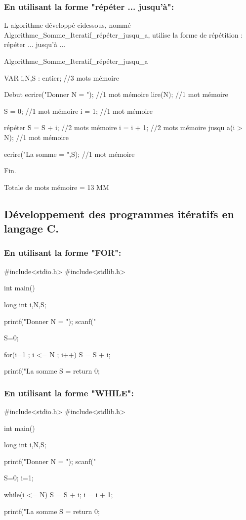 \documentclass[•]{article}
\begin{document}
\subsubsection{En utilisant la forme "répéter ... jusqu'à":}
\textrm{L algorithme développé ci\-dessous, nommé Algorithme\_Somme\_Iteratif\_répéter\_jusqu\_a, utilise la forme de répétition : répéter ... jusqu'à ...}
\begin{sql}

 Algorithme_Somme_Iteratif_répéter_jusqu_a
 
 VAR
 i,N,S : entier;				//3 mots mémoire
 
 Debut
	ecrire("Donner N = ");		//1 mot mémoire
	lire(N);					//1 mot mémoire
	
	S = 0;						//1 mot mémoire
	i = 1;						//1 mot mémoire
	
	répéter
		S = S + i;				//2 mots mémoire
		i = i + 1;				//2 mots mémoire
	  jusqu a(i > N);			//1 mot mémoire
	  
	ecrire("La somme = ",S);	//1 mot mémoire
	
 Fin.
\end{sql}
\textrm{Totale de mots mémoire = 13 MM}

\subsection{Développement des programmes itératifs en langage C.}
\subsubsection{En utilisant la forme "FOR":}
\begin{sql}
 #include<stdio.h>
 #include<stdlib.h> 
 
 int main()
 {
	long int i,N,S;
	
	printf("Donner N = ");
	scanf("%
	
	S=0;
	
	for(i=1 ; i <= N ; i++)
	{
		S = S + i;
	}
	
	printf("La somme S = %
	return 0;
 }
\end{sql}

\subsubsection{En utilisant la forme "WHILE":}
\begin{sql}
 #include<stdio.h>
 #include<stdlib.h>
 
 int main()
 {
	long int i,N,S;
	
	printf("Donner N = ");
	scanf("%
	
	S=0; i=1;
	
	while(i <= N)
	{
		S = S + i;
		i = i + 1;
	}
	
	printf("La somme S = %
	return 0;
 }
\end{sql}
\end{document}
